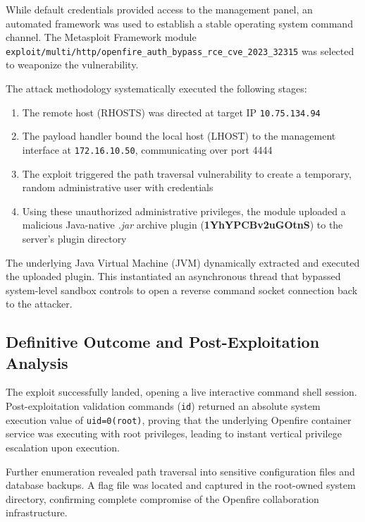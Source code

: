 \documentclass[11pt,a4paper]{article}
\begin{document}
While default credentials provided access to the management panel, an automated framework was used to establish a stable operating system command channel. The Metasploit Framework module \texttt{exploit/multi/http/openfire\_auth\_bypass\_rce\_cve\_2023\_32315} was selected to weaponize the vulnerability.

The attack methodology systematically executed the following stages:

\begin{enumerate}
    \item The remote host (RHOSTS) was directed at target IP \texttt{10.75.134.94}
    \item The payload handler bound the local host (LHOST) to the management interface at \texttt{172.16.10.50}, communicating over port 4444
    \item The exploit triggered the path traversal vulnerability to create a temporary, random administrative user with credentials
    \item Using these unauthorized administrative privileges, the module uploaded a malicious Java-native \textit{.jar} archive plugin (\textbf{1YhYPCBv2uGOtnS}) to the server's plugin directory
\end{enumerate}

The underlying Java Virtual Machine (JVM) dynamically extracted and executed the uploaded plugin. This instantiated an asynchronous thread that bypassed system-level sandbox controls to open a reverse command socket connection back to the attacker.

\subsection{Definitive Outcome and Post-Exploitation Analysis}

The exploit successfully landed, opening a live interactive command shell session. Post-exploitation validation commands (\texttt{id}) returned an absolute system execution value of \texttt{uid=0(root)}, proving that the underlying Openfire container service was executing with root privileges, leading to instant vertical privilege escalation upon execution.

Further enumeration revealed path traversal into sensitive configuration files and database backups. A flag file was located and captured in the root-owned system directory, confirming complete compromise of the Openfire collaboration infrastructure.

\end{document}
